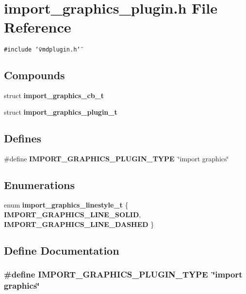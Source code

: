 \section{import\_\-graphics\_\-plugin.h File Reference}
\label{import__graphics__plugin_8h}
{\tt \#include \char`\"{}vmdplugin.h\char`\"{}}\par
\subsection*{Compounds}
\begin{CompactItemize}
\item 
struct {\bf import\_\-graphics\_\-cb\_\-t}
\item 
struct {\bf import\_\-graphics\_\-plugin\_\-t}
\end{CompactItemize}
\subsection*{Defines}
\begin{CompactItemize}
\item 
\#define {\bf IMPORT\_\-GRAPHICS\_\-PLUGIN\_\-TYPE}\ \char`\"{}import graphics\char`\"{}
\end{CompactItemize}
\subsection*{Enumerations}
\begin{CompactItemize}
\item 
enum {\bf import\_\-graphics\_\-linestyle\_\-t} \{ {\bf IMPORT\_\-GRAPHICS\_\-LINE\_\-SOLID}, 
{\bf IMPORT\_\-GRAPHICS\_\-LINE\_\-DASHED}
 \}
\end{CompactItemize}


\subsection{Define Documentation}
\subsubsection{\setlength{\rightskip}{0pt plus 5cm}\#define IMPORT\_\-GRAPHICS\_\-PLUGIN\_\-TYPE\ \char`\"{}import graphics\char`\"{}}\label{import__graphics__plugin_8h_a0}




